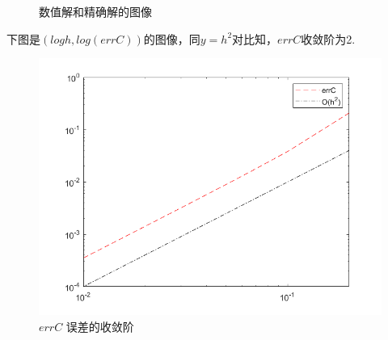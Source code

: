 \documentclass{article}
\begin{document}
\begin{figure}[H]
{\begin{minipage}[t]{0.3\linewidth}
\end{minipage}
}

\caption{\label{solution_image}数值解和精确解的图像}

\end{figure}

下图是$(logh,log(errC))$的图像，同$y=h^2$对比知，$errC$收敛阶为2.
\begin{figure}[H]
\centering
\includegraphics[scale=0.5]{errC.png}
\caption{\label{errC}$errC$ 误差的收敛阶}
\end{figure}
\end{document}
